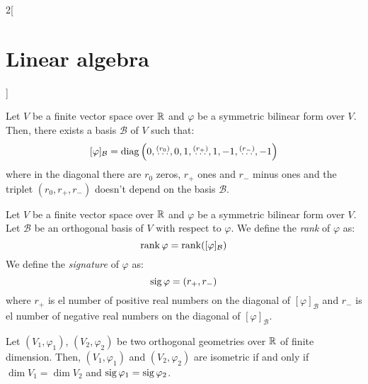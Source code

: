 \documentclass[../../../main.tex]{subfiles}
\begin{document}
\begin{multicols}{2}[\section{Linear algebra}]
\begin{theorem}
    Let $V$ be a finite vector space over $\mathbb{R}$ and $\varphi$ be a symmetric bilinear form over $V$. Then, there exists a basis $\mathcal{B}$ of $V$ such that:
    $$[\varphi]_\mathcal{B}=\operatorname{diag}\left(0,\overset{(r_0)}{\ldots},0,1,\overset{(r_+)}{\ldots},1,-1,\overset{(r_-)}{\ldots},-1\right)$$
    where in the diagonal there are $r_0$ zeros, $r_+$ ones and $r_-$ minus ones and the triplet $(r_0,r_+,r_-)$ doesn't depend on the basis $\mathcal{B}$.
  \end{theorem}
  \begin{definition}
    Let $V$ be a finite vector space over $\mathbb{R}$ and $\varphi$ be a symmetric bilinear form over $V$. Let $\mathcal{B}$ be an orthogonal basis of $V$ with respect to $\varphi$. We define the \emph{rank} of $\varphi$ as: $$\rank \varphi=\rank ([\varphi]_\mathcal{B})$$ We define the \emph{signature} of $\varphi$ as: $$\operatorname{sig}\varphi=(r_+,r_-)$$ where $r_+$ is el number of positive real numbers on the diagonal of $[\varphi]_\mathcal{B}$ and $r_-$ is el number of negative real numbers on the diagonal of $[\varphi]_\mathcal{B}$.
  \end{definition}
  \begin{theorem}
    Let $(V_1,\varphi_1)$, $(V_2,\varphi_2)$ be two orthogonal geometries over $\mathbb{R}$ of finite dimension. Then, $(V_1,\varphi_1)$ and $(V_2,\varphi_2)$ are isometric if and only if $\dim V_1=\dim V_2$ and $\operatorname{sig} \varphi_1=\operatorname{sig} \varphi_2$.
  \end{theorem}

\end{multicols}
\end{document}
